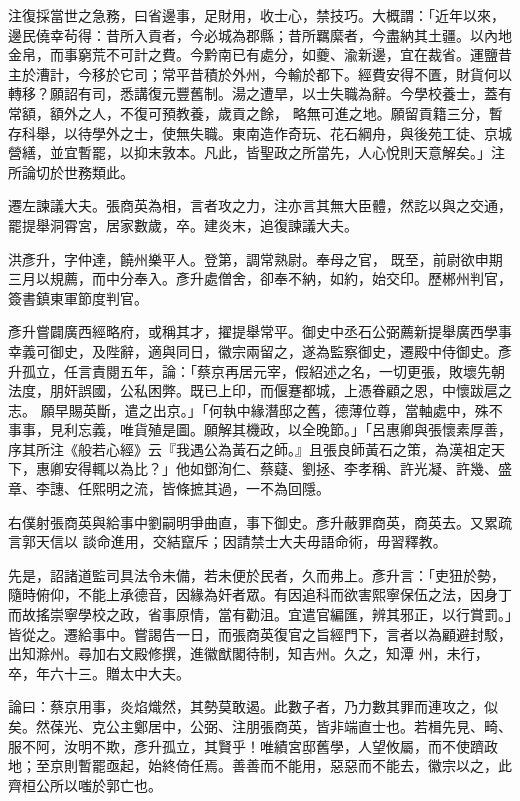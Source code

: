 \begin{pinyinscope}
 注復採當世之急務，曰省邊事，足財用，收士心，禁技巧。大概謂：「近年以來，邊民僥幸茍得：昔所入貢者，今必城為郡縣；昔所羈縻者，今盡納其土疆。以內地金帛，而事窮荒不可計之費。今黔南已有處分，如夔、渝新邊，宜在裁省。運鹽昔主於漕計，今移於它司；常平昔積於外州，今輸於都下。經費安得不匱，財貨何以轉移？願詔有司，悉講復元豐舊制。湯之遭旱，以士失職為辭。今學校養士，蓋有常額，額外之人，不復可預教養，歲貢之餘，
 略無可進之地。願留貢籍三分，暫存科舉，以待學外之士，使無失職。東南造作奇玩、花石綱舟，與後苑工徒、京城營繕，並宜暫罷，以抑末敦本。凡此，皆聖政之所當先，人心悅則天意解矣。」注所論切於世務類此。



 遷左諫議大夫。張商英為相，言者攻之力，注亦言其無大臣體，然訖以與之交通，罷提舉洞霄宮，居家數歲，卒。建炎末，追復諫議大夫。



 洪彥升，字仲達，饒州樂平人。登第，調常熟尉。奉母之官，
 既至，前尉欲申期三月以規薦，而中分奉入。彥升處僧舍，卻奉不納，如約，始交印。歷郴州判官，簽書鎮東軍節度判官。



 彥升嘗闢廣西經略府，或稱其才，擢提舉常平。御史中丞石公弼薦新提舉廣西學事幸義可御史，及陛辭，適與同日，徽宗兩留之，遂為監察御史，遷殿中侍御史。彥升孤立，任言責閱五年，論：「蔡京再居元宰，假紹述之名，一切更張，敗壞先朝法度，朋奸誤國，公私困弊。既已上印，而偃蹇都城，上憑眷顧之恩，中懷跋扈之志。
 願早賜英斷，遣之出京。」「何執中緣潛邸之舊，德薄位尊，當軸處中，殊不事事，見利忘義，唯貨殖是圖。願解其機政，以全晚節。」「呂惠卿與張懷素厚善，序其所注《般若心經》云『我遇公為黃石之師。』且張良師黃石之策，為漢祖定天下，惠卿安得輒以為比？」他如鄧洵仁、蔡薿、劉拯、李孝稱、許光凝、許幾、盛章、李譓、任熙明之流，皆條摭其過，一不為回隱。



 右僕射張商英與給事中劉嗣明爭曲直，事下御史。彥升蔽罪商英，商英去。又累疏言郭天信以
 談命進用，交結竄斥；因請禁士大夫毋語命術，毋習釋教。



 先是，詔諸道監司具法令未備，若未便於民者，久而弗上。彥升言：「吏狃於勢，隨時俯仰，不能上承德音，因緣為奸者眾。有因追科而欲害熙寧保伍之法，因身丁而故搖崇寧學校之政，省事原情，當有勸沮。宜遣官編匯，辨其邪正，以行賞罰。」皆從之。遷給事中。嘗謁告一日，而張商英復官之旨經門下，言者以為顧避封駁，出知滁州。尋加右文殿修撰，進徽猷閣待制，知吉州。久之，知潭
 州，未行，卒，年六十三。贈太中大夫。



 論曰：蔡京用事，炎焰熾然，其勢莫敢遏。此數子者，乃力數其罪而連攻之，似矣。然葆光、克公主鄭居中，公弼、注朋張商英，皆非端直士也。若楫先見、畸、服不阿，汝明不欺，彥升孤立，其賢乎！唯績宮邸舊學，人望攸屬，而不使躋政地；至京則暫罷亟起，始終倚任焉。善善而不能用，惡惡而不能去，徽宗以之，此齊桓公所以嗤於郭亡也。




\end{pinyinscope}
